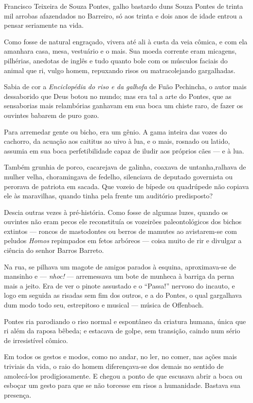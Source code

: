 Francisco Teixeira de Souza Pontes, galho bastardo duns Souza Pontes de
trinta mil arrobas afazendados no Barreiro, só aos trinta e dois anos de
idade entrou a pensar seriamente na vida.

Como fosse de natural engraçado, vivera até ali à custa da veia cômica,
e com ela amanhara casa, mesa, vestuário e o mais. Sua moeda corrente
eram micagens, pilhérias, anedotas de inglês e tudo quanto bole com os
músculos faciais do animal que ri, vulgo homem, repuxando risos ou
matracolejando gargalhadas.

Sabia de cor a \emph{Enciclopédia do riso e da galhofa} de Fuão
Pechincha, o autor mais dessaborido que Deus botou no mundo; mas era tal
a arte do Pontes, que as sensaborias mais relambórias ganhavam em sua
boca um chiste raro, de fazer os ouvintes babarem de puro gozo.

Para arremedar gente ou bicho, era um gênio. A gama inteira das vozes do
cachorro, da acuação aos caititus ao uivo à lua, e o mais, rosnado ou
latido, assumia em sua boca perfetibilidade capaz de iludir aos próprios
cães --- e à lua.

Também grunhia de porco, cacarejava de galinha, coaxava de
untanha,ralhava de mulher velha, choramingava de fedelho, silenciava de
deputado governista ou perorava de patriota em sacada. Que vozeio de
bípede ou quadrúpede não copiava ele às maravilhas, quando tinha pela
frente um auditório predisposto?

Descia outras vezes à pré-história. Como fosse de algumas luzes, quando
os ouvintes não eram pecos ele reconstituía os vozeirões paleontológicos
dos bichos extintos --- roncos de mastodontes ou berros de mamutes ao
avistarem-se com peludos \emph{Homos} repimpados em fetos arbóreos ---
coisa muito de rir e divulgar a ciência do senhor Barros Barreto.

Na rua, se pilhava um magote de amigos parados à esquina, aproximava-se
de mansinho e --- \emph{nhoc!} --- arremessava um bote de munheca à
barriga da perna mais a jeito. Era de ver o pinote assustado e o
``Passa!'' nervoso do incauto, e logo em seguida as risadas sem fim dos
outros, e a do Pontes, o qual gargalhava dum modo todo seu, estrepitoso
e musical --- música de Offenbach.

Pontes ria parodiando o riso normal e espontâneo da criatura humana,
única que ri além da raposa bêbeda; e estacava de golpe, sem transição,
caindo num sério de irresistível cômico.

Em todos os gestos e modos, como no andar, no ler, no comer, nas ações
mais triviais da vida, o raio do homem diferençava-se dos demais no
sentido de amolecá-los prodigiosamente. E chegou a ponto de que escusava
abrir a boca ou esboçar um gesto para que se não torcesse em risos a
humanidade. Bastava sua presença.

